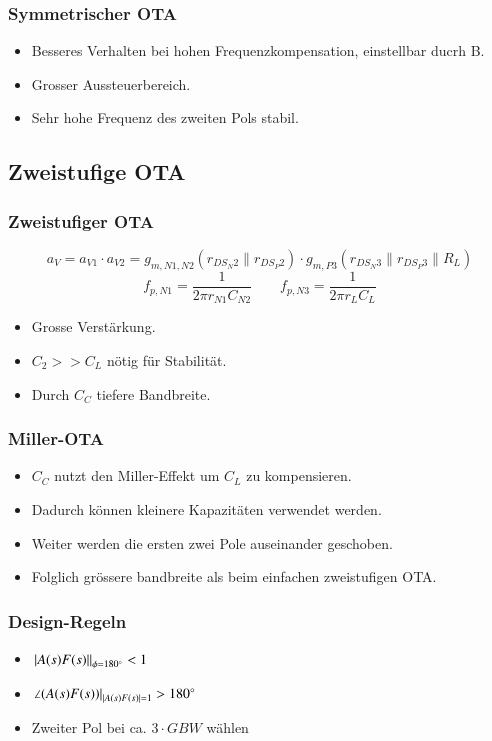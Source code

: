 \subsubsection{Symmetrischer OTA}
\begin{itemize}
    \item Besseres Verhalten bei hohen Frequenzkompensation, einstellbar ducrh B.
    \item Grosser Aussteuerbereich.
    \item Sehr hohe Frequenz des zweiten Pols \textrightarrow{} stabil.
\end{itemize}


\subsection{Zweistufige OTA}

\subsubsection{Zweistufiger OTA}
\[
    a_V = a_{V1} \cdot a_{V2} = g_{m, N1, N2} (r_{DS_N2} \parallel r_{DS_P2}) \cdot g_{m, P3} (r_{DS_N3} \parallel r_{DS_P3} \parallel R_L)
\]
\[
    f_{p,N1} = \frac{1}{2\pi r_{N1} C_{N2}} \qquad f_{p,N3} = \frac{1}{2\pi r_{L} C_{L}}
\]

\begin{itemize}
    \item Grosse Verstärkung.
    \item $C_2 >> C_L$ nötig für Stabilität.
    \item Durch $C_C$ tiefere Bandbreite.
\end{itemize}

\subsubsection{Miller-OTA}

\begin{itemize}
    \item $C_C$ nutzt den Miller-Effekt um $C_L$ zu kompensieren.
    \item Dadurch können kleinere Kapazitäten verwendet werden.
    \item Weiter werden die ersten zwei Pole auseinander geschoben. 
    \item Folglich grössere bandbreite als beim einfachen zweistufigen OTA.
\end{itemize} %


\subsubsection{Design-Regeln}
\begin{itemize}
    \item $\left. \left|A(s)F(s)\right| \right|_{\phi = 180^\circ} < 1$
    \item $\left. \angle (A(s)F(s)) \right|_{\left|A(s)F(s)\right| = 1} > 180^\circ$
    \item Zweiter Pol bei ca. $3 \cdot GBW$ wählen
\end{itemize}

